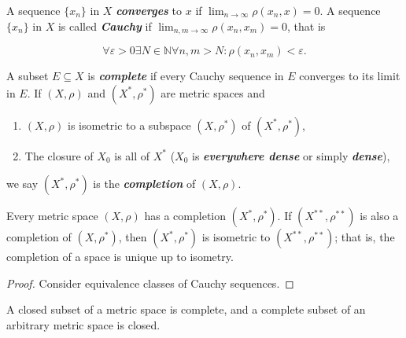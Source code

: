 \documentclass{article}
\theoremstyle{definition}
\numberwithin{equation}{section}
\newcommand{\N}{\mathbb{N}}
\begin{document}
	A sequence $\{x_n\}$ in $X$ \textbf{\textit{converges}} to $x$ if $\lim_{n\to\infty}\rho(x_n,x)=0$. A sequence $\{x_n\}$ in $X$ is called \textbf{\textit{Cauchy}} if $\lim_{n,m\to\infty}\rho(x_n,x_m)=0$, that is
	
	\[\forall\varepsilon>0\exists N\in\N\forall n,m>N:\rho(x_n,x_m)<\varepsilon.\]
	
	A subset $E\subseteq X$ is \textbf{\textit{complete}} if every Cauchy sequence in $E$ converges to its limit in $E$. If $(X,\rho)$ and $(X^*,\rho^*)$ are metric spaces and
	\begin{enumerate}
		\item $(X,\rho)$ is isometric to a subspace $(X,\rho^*)$ of $(X^*,\rho^*)$,
		\item The closure of $X_0$ is all of $X^*$ ($X_0$ is \textbf{\textit{everywhere dense}} or simply \textbf{\textit{dense}}),
	\end{enumerate}
	we say $(X^*,\rho^*)$ is the \textbf{\textit{completion}} of $(X,\rho)$.
	\begin{thm}
		Every metric space $(X,\rho)$ has a completion $(X^*,\rho^*)$. If $(X^{**},\rho^{**})$ is also a completion of $(X,\rho^*)$, then $(X^*,\rho^*)$ is isometric to $(X^{**},\rho^{**})$; that is, the completion of a space is unique up to isometry.
	\end{thm}
	\begin{proof}
		Consider equivalence classes of Cauchy sequences.
	\end{proof}
	
	\begin{prop}
		A closed subset of a metric space is complete, and a complete subset of an arbitrary metric space is closed.
	\end{prop}
	
\end{document}
